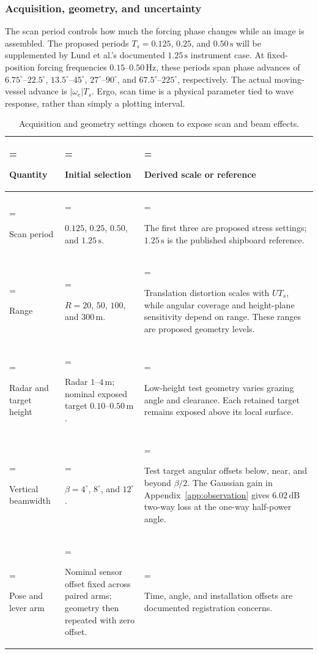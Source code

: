 \documentclass[10pt,letterpaper]{article}
\begin{document}
\subsubsection{Acquisition, geometry, and uncertainty}

The scan period controls how much the forcing phase changes while an image is assembled. The proposed periods $T_s=0.125$, $0.25$, and $0.50\,\mathrm{s}$ will be supplemented by Lund et al.'s documented $1.25\,\mathrm{s}$ instrument case. \cite{Lund2018SeaIceDrift} At fixed-position forcing frequencies $0.15$--$0.50\,\mathrm{Hz}$, these periods span phase advances of $6.75^\circ$--$22.5^\circ$, $13.5^\circ$--$45^\circ$, $27^\circ$--$90^\circ$, and $67.5^\circ$--$225^\circ$, respectively. The actual moving-vessel advance is $|\omega_e|T_s$. Ergo, scan time is a physical parameter tied to wave response, rather than simply a plotting interval.

\begin{table}[H]
\centering
\caption{Acquisition and geometry settings chosen to expose scan and beam effects.}
\label{tab:acquisition-choices}
\small
\begin{tabularx}{\textwidth}{@{}>{\hsize=0.7\hsize\linewidth=\hsize\raggedright\arraybackslash}X>{\hsize=1.0\hsize\linewidth=\hsize\raggedright\arraybackslash}X>{\hsize=1.3\hsize\linewidth=\hsize\raggedright\arraybackslash}X@{}}
\toprule
Quantity & Initial selection & Derived scale or reference \\
\midrule
Scan period & $0.125$, $0.25$, $0.50$, and $1.25\,\mathrm{s}$. & The first three are proposed stress settings; $1.25\,\mathrm{s}$ is the published shipboard reference. \cite{Lund2018SeaIceDrift} \\
Range & $R=20$, $50$, $100$, and $300\,\mathrm{m}$. & Translation distortion scales with $UT_s$, while angular coverage and height-plane sensitivity depend on range. These ranges are proposed geometry levels. \\
Radar and target height & Radar $1$--$4\,\mathrm{m}$; nominal exposed target $0.10$--$0.50\,\mathrm{m}$. & Low-height test geometry varies grazing angle and clearance. Each retained target remains exposed above its local surface. \\
Vertical beamwidth & $\beta=4^\circ$, $8^\circ$, and $12^\circ$. & Test target angular offsets below, near, and beyond $\beta/2$. The Gaussian gain in Appendix~\ref{app:observation} gives $6.02\,\mathrm{dB}$ two-way loss at the one-way half-power angle. \\
Pose and lever arm & Nominal sensor offset fixed across paired arms; geometry then repeated with zero offset. & Time, angle, and installation offsets are documented registration concerns. \cite{McCann2018OffsetCalibration} \\
\bottomrule
\end{tabularx}
\end{table}
\end{document}
